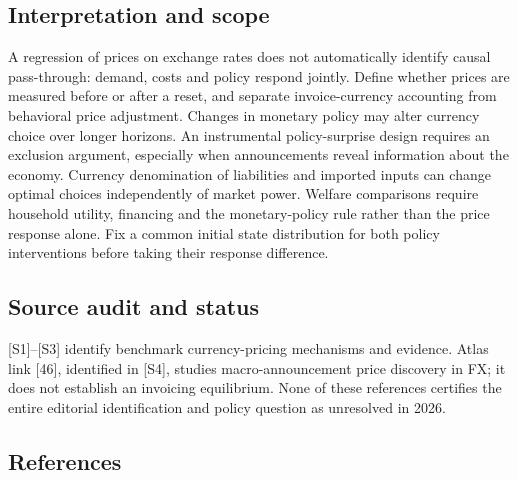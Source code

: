 \documentclass[11pt,a4paper]{article}
\begin{document}
\subsection*{Interpretation and scope}
A regression of prices on exchange rates does not automatically identify causal pass-through: demand, costs and policy respond jointly. Define whether prices are measured before or after a reset, and separate invoice-currency accounting from behavioral price adjustment. Changes in monetary policy may alter currency choice over longer horizons. An instrumental policy-surprise design requires an exclusion argument, especially when announcements reveal information about the economy. Currency denomination of liabilities and imported inputs can change optimal choices independently of market power. Welfare comparisons require household utility, financing and the monetary-policy rule rather than the price response alone. Fix a common initial state distribution for both policy interventions before taking their response difference.

\subsection*{Source audit and status}
[S1]–[S3] identify benchmark currency-pricing mechanisms and evidence. Atlas link [46], identified in [S4], studies macro-announcement price discovery in FX; it does not establish an invoicing equilibrium. None of these references certifies the entire editorial identification and policy question as unresolved in 2026.

\subsection*{References}
\end{document}
